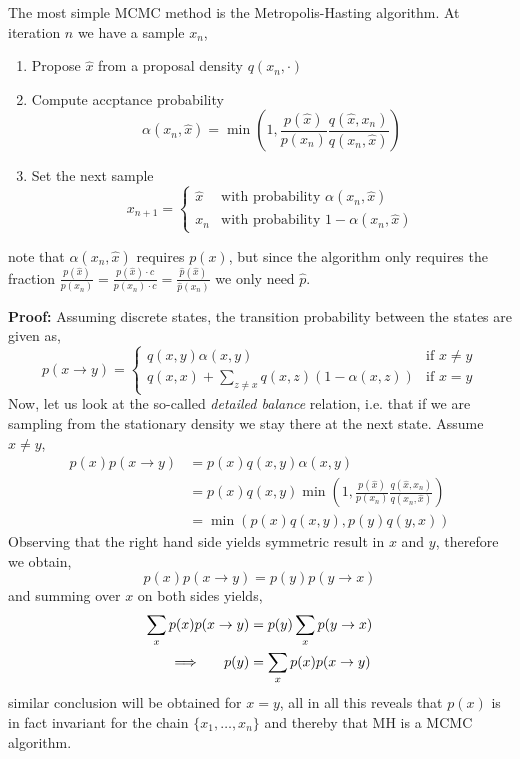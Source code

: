\begin{testexample}
    The most simple MCMC method is the Metropolis-Hasting algorithm. At iteration
    $n$ we have a sample $x_n$,
    \begin{enumerate}
        \item Propose $\hat x$ from a proposal density $q(x_n,\cdot)$
        \item Compute accptance probability $$\alpha(x_n,\hat x) = \min \left(1, \frac{p(\hat x)}{p(x_n)} \frac{q(\hat x, x_n)}{q(x_n,\hat x)}\right)$$
        \item Set the next sample $$x_{n+1} = \begin{cases}
            \hat x &\text{with probability } \alpha(x_n, \hat x)\\
             x_n &\text{with probability } 1-\alpha(x_n, \hat x)
        \end{cases}$$
    \end{enumerate}
    note that $\alpha(x_n,\hat x)$ requires $p(x)$, but since the algorithm only
    requires the fraction $\frac{p(\hat x)}{p(x_n)} = \frac{p(\hat x)\cdot c}{p(x_n)\cdot c} = \frac{\hat p(\hat x)}{\hat p(x_n)}$
    we only need $\hat p$. 
    
    \textbf{Proof:} Assuming discrete states, the transition probability between the states are given as, 
    $$p(x\rightarrow y) = \begin{cases}
        q(x,y)\alpha(x,y) & \text{if } x\neq y\\
        q(x,x) + \sum_{z\neq x} q(x,z)(1-\alpha(x,z)) & \text{if } x=y
    \end{cases}$$
    Now, let us look at the so-called \textit{detailed balance} relation, i.e. that if we are sampling from the
    stationary density we stay there at the next state. Assume $x\neq y$, 
    \begin{align*}
        p(x)p(x\rightarrow y) &= p(x)q(x,y)\alpha(x,y)\\
        &=p(x)q(x,y) \min \left(1, \frac{p(\hat x)}{p(x_n)} \frac{q(\hat x, x_n)}{q(x_n,\hat x)}\right)\\
        &= \min(p(x)q(x,y), p(y)q(y,x))
    \end{align*}
    Observing that the right hand side yields symmetric result in $x$ and $y$, therefore we obtain, 
    $$p(x)p(x\rightarrow y) = p(y)p(y\rightarrow x)$$
    and summing over $x$ on both sides yields,
    \begin{align}
        \sum_x p(x)p(x\rightarrow y) &= p(y) \sum_x p(y\rightarrow x)\\
        \implies \hspace{0.5cm} p(y) &= \sum_x p(x)p(x\rightarrow y)
    \end{align}
    similar conclusion will be obtained for $x = y$, all in all this reveals that $p(x)$ is in fact invariant for the chain
     $\{x_1, \dots , x_n\}$ and thereby that MH is a MCMC algorithm. 
\end{testexample}

